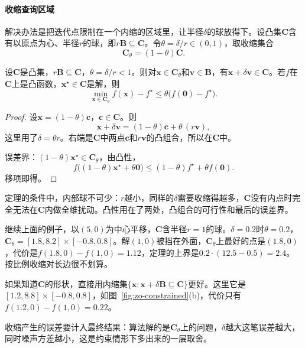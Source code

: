 \paragraph{收缩查询区域}
解决办法是把迭代点限制在一个内缩的区域里，让半径$\delta$的球放得下。设凸集$\bm{C}$含有以原点为心、半径$r$的球，即$r\bm{B}\subseteq\bm{C}$。令$\theta=\delta/r\in(0,1)$，取收缩集合
\begin{equation}
 \bm{C}_\theta=(1-\theta)\bm{C}.
 \label{eq:zo-shrink}
\end{equation}

\begin{theorem}[收缩集合的查询可行性与边界误差]
\label{thm:zo-shrink}
设$\bm{C}$是凸集，$r\bm{B}\subseteq\bm{C}$，$\theta=\delta/r<1$。则对$\bm{x}\in\bm{C}_\theta$和$\bm{v}\in\bm{B}$，有$\bm{x}+\delta\bm{v}\in\bm{C}$。若$f$在$\bm{C}$上是凸函数，$\bm{x}^\star\in\bm{C}$是解，则
\begin{equation}
 \min_{\bm{x}\in\bm{C}_\theta}f(\bm{x})-f^\star\leq\theta\bigl(f(\bm{0})-f^\star\bigr).
 \label{eq:zo-shrink-error}
\end{equation}
\end{theorem}

\begin{proof}
设$\bm{x}=(1-\theta)\bm{c}$，$\bm{c}\in\bm{C}$。则
\[
 \bm{x}+\delta\bm{v}=(1-\theta)\bm{c}+\theta\,(r\bm{v}),
\]
这里用了$\delta=\theta r$。右端是$\bm{C}$中两点$\bm{c}$和$r\bm{v}$的凸组合，所以在$\bm{C}$中。

误差界：$(1-\theta)\bm{x}^\star\in\bm{C}_\theta$，由凸性，
\[
 f\bigl((1-\theta)\bm{x}^\star+\theta\bm{0}\bigr)\leq(1-\theta)f^\star+\theta f(\bm{0}).
\]
移项即得。
\end{proof}

定理的条件中，内部球不可少：$r$越小，同样的$\delta$需要收缩得越多，$\bm{C}$没有内点时完全无法在$\bm{C}$内做全维扰动。凸性用在了两处，凸组合的可行性和最后的误差界。

继续上面的例子，以$(5,0)$为中心平移，$\bm{C}$含半径$r=1$的球。$\delta=0.2$时$\theta=0.2$，$\bm{C}_\theta=[1.8,8.2]\times[-0.8,0.8]$。解$(1,0)$被挡在外面，$\bm{C}_\theta$上最好的点是$(1.8,0)$，代价是$f(1.8,0)-f(1,0)=1.12$，定理的上界是$0.2\cdot(12.5-0.5)=2.4$。按比例收缩对长边很不划算。

如果知道$\bm{C}$的形状，直接用内缩集$\{\bm{x}:\bm{x}+\delta\bm{B}\subseteq\bm{C}\}$更好。这里它是$[1.2,8.8]\times[-0.8,0.8]$，如图~\ref{fig:zo-constrained}(b)，代价只有$f(1.2,0)-f(1,0)=0.22$。

收缩产生的误差要计入最终结果：算法解的是$\bm{C}_\theta$上的问题，$\delta$越大这笔误差越大，同时噪声方差越小，这是约束情形下多出来的一层取舍。

